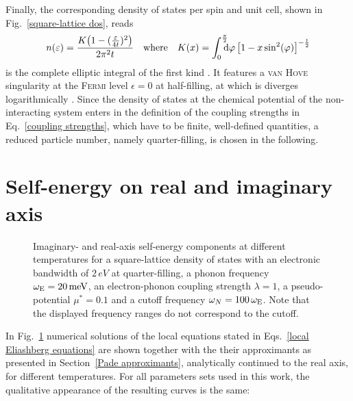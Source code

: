 Finally, the corresponding density of states per spin and unit cell, shown in
Fig.~\ref{square-lattice dos}, reads
%
\begin{equation*}
    n(\epsilon) = \frac{K \big(1 - (\tfrac \epsilon {4 t})^2 \big)}{2 \pi^2 t}
    \quad \text{where} \quad
    K(x) = \int \from 0 \till{\frac \pi 2} \D \varphi \,
    \big[ 1 - x \sin^2(\varphi) \big]^{-\frac 1 2}
\end{equation*}
%
is the complete elliptic integral of the first kind \cite[Eq.~4.146 and
4.147]{Czycholl08}. It features a \textsc{van Hove} singularity at the
\textsc{Fermi} level $\epsilon = 0$ at half-filling, at which is diverges
logarithmically \cite[Eq.~7]{Szczesniak06}. Since the density of states at the
chemical potential of the non-interacting system enters in the definition of the
coupling strengths in Eq.~\ref{coupling strengths}, which have to be finite,
well-defined quantities, a reduced particle number, namely quarter-filling, is
chosen in the following.

\section{Self-energy on real and imaginary axis}

\begin{figure}
    \small
    
    
    
    
    
    
    \caption[Self-energy on both complex axes at different temperatures]{
        Imaginary- and real-axis self-energy components at different
        temperatures for a square-lattice density of states with an electronic
        bandwidth of $2 \, \unit{eV}$ at quarter-filling, a phonon frequency
        $\omega \sb{\text{E}} = 20 \, \mathrm{meV}$, an electron-phonon coupling strength
        $\lambda = 1$, a  pseudo-potential $\mu^* = 0.1$ and a
        cutoff frequency $\omega_N = 100 \, \omega \sb{\text{E}}$. Note that the
        displayed frequency ranges do not correspond to the cutoff.}
    \label{imaginary- and real-axis self-energy components}
\end{figure}
%
In Fig.~\ref{imaginary- and real-axis self-energy components} numerical
solutions of the local  equations stated in Eqs.~\ref{local
Eliashberg equations} are shown together with the their  approximants
as presented in Section~\ref{Pade approximants}, analytically continued to the
real axis, for different temperatures. For all parameters sets used in this
work, the qualitative appearance of the resulting curves is the same:

